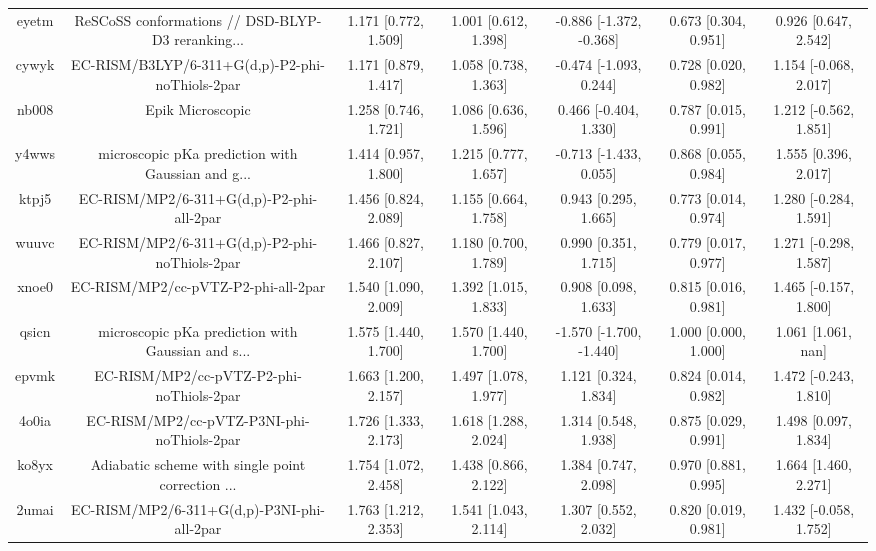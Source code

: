 \documentclass{article}
\begin{document}
\begin{center}
\begin{longtable}{|ccccccc|}
 eyetm &  ReSCoSS conformations // DSD-BLYP-D3 reranking... &     1.171 [0.772, 1.509] &     1.001 [0.612, 1.398] &  -0.886 [-1.372, -0.368] &  0.673 [0.304, 0.951] &    0.926 [0.647, 2.542] \\
 cywyk &    EC-RISM/B3LYP/6-311+G(d,p)-P2-phi-noThiols-2par &     1.171 [0.879, 1.417] &     1.058 [0.738, 1.363] &   -0.474 [-1.093, 0.244] &  0.728 [0.020, 0.982] &   1.154 [-0.068, 2.017] \\
 nb008 &                                   Epik Microscopic &     1.258 [0.746, 1.721] &     1.086 [0.636, 1.596] &    0.466 [-0.404, 1.330] &  0.787 [0.015, 0.991] &   1.212 [-0.562, 1.851] \\
 y4wws &  microscopic pKa prediction with Gaussian and g... &     1.414 [0.957, 1.800] &     1.215 [0.777, 1.657] &   -0.713 [-1.433, 0.055] &  0.868 [0.055, 0.984] &    1.555 [0.396, 2.017] \\
 ktpj5 &           EC-RISM/MP2/6-311+G(d,p)-P2-phi-all-2par &     1.456 [0.824, 2.089] &     1.155 [0.664, 1.758] &     0.943 [0.295, 1.665] &  0.773 [0.014, 0.974] &   1.280 [-0.284, 1.591] \\
 wuuvc &      EC-RISM/MP2/6-311+G(d,p)-P2-phi-noThiols-2par &     1.466 [0.827, 2.107] &     1.180 [0.700, 1.789] &     0.990 [0.351, 1.715] &  0.779 [0.017, 0.977] &   1.271 [-0.298, 1.587] \\
 xnoe0 &                EC-RISM/MP2/cc-pVTZ-P2-phi-all-2par &     1.540 [1.090, 2.009] &     1.392 [1.015, 1.833] &     0.908 [0.098, 1.633] &  0.815 [0.016, 0.981] &   1.465 [-0.157, 1.800] \\
 qsicn &  microscopic pKa prediction with Gaussian and s... &     1.575 [1.440, 1.700] &     1.570 [1.440, 1.700] &  -1.570 [-1.700, -1.440] &  1.000 [0.000, 1.000] &      1.061 [1.061, nan] \\
 epvmk &           EC-RISM/MP2/cc-pVTZ-P2-phi-noThiols-2par &     1.663 [1.200, 2.157] &     1.497 [1.078, 1.977] &     1.121 [0.324, 1.834] &  0.824 [0.014, 0.982] &   1.472 [-0.243, 1.810] \\
 4o0ia &         EC-RISM/MP2/cc-pVTZ-P3NI-phi-noThiols-2par &     1.726 [1.333, 2.173] &     1.618 [1.288, 2.024] &     1.314 [0.548, 1.938] &  0.875 [0.029, 0.991] &    1.498 [0.097, 1.834] \\
 ko8yx &  Adiabatic scheme with single point correction ... &     1.754 [1.072, 2.458] &     1.438 [0.866, 2.122] &     1.384 [0.747, 2.098] &  0.970 [0.881, 0.995] &    1.664 [1.460, 2.271] \\
 2umai &         EC-RISM/MP2/6-311+G(d,p)-P3NI-phi-all-2par &     1.763 [1.212, 2.353] &     1.541 [1.043, 2.114] &     1.307 [0.552, 2.032] &  0.820 [0.019, 0.981] &   1.432 [-0.058, 1.752] \\

\end{longtable}
\end{center}
\end{document}
